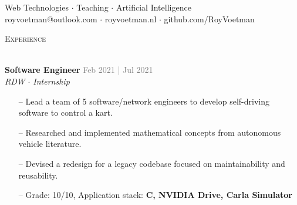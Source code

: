 \documentclass[a4paper]{article}
\newcommand{\lineunder} {
    \vspace*{-8pt} \\
    \hspace*{-18pt} \hrulefill \\
}
\newcommand{\header} [1] {
    {\hspace*{-18pt}\vspace*{6pt} \textsc{#1}}
    \vspace*{-6pt} \lineunder
}
\newcommand{\roundpic}[4][]{
  \tikz\node [circle, minimum width = #2,
    path picture = {
      \node [#1] at (path picture bounding box.center) {
        \texttt{[image: \#4]}};
    }] {};}
\begin{document}
\vspace*{-40pt}

    

\vspace*{-10pt}

\vspace{10mm}

\begin{center}
    \centering
    \raisebox{-0.5\height}{\roundpic{2cm}{2cm}{avatar.jpg}}
    \hspace*{.1in}
    
    \vspace*{10pt}
    {Web Technologies $\cdot$ Teaching $\cdot$ Artificial Intelligence}\\
    \vspace*{3pt}
	royvoetman@outlook.com $\cdot$ royvoetman.nl $\cdot$ github.com/RoyVoetman\\
\end{center}

\vspace{5mm}

\header{Experience}
\vspace{1mm}

\textbf{Software Engineer} \hfill \textcolor{gray}{Feb 2021 | Jul 2021}\\
\textit{RDW $\cdot$ Internship}\\
\vspace{-1mm}
\begin{itemize} \itemsep 1pt
    \item[--] Lead a team of 5 software/network engineers to develop self-driving software to control a kart.
	\item[--] Researched and implemented mathematical concepts from autonomous vehicle literature.
    \item[--] Devised a redesign for a legacy codebase focused on maintainability and reusability.
	\item[--] Grade: 10/10, Application stack: \textbf{C\scalebox{0.7}{++}, NVIDIA Drive, Carla Simulator}
\end{itemize}
\end{document}
